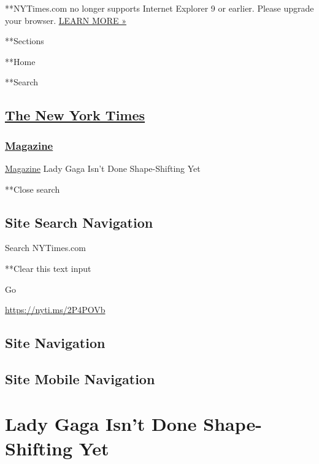  **NYTimes.com no longer supports Internet Explorer 9 or earlier. Please
upgrade your browser.
\href{http://www.nytimes3xbfgragh.onion/content/help/site/ie9-support.html}{LEARN
MORE »}

**Sections

**Home

**Search

\hypertarget{the-new-york-times}{%
\subsection{\texorpdfstring{\href{http://www.nytimes3xbfgragh.onion/}{The
New York Times}}{The New York Times}}\label{the-new-york-times}}

\hypertarget{-magazine-}{%
\subsubsection{\texorpdfstring{
\href{https://www.nytimes3xbfgragh.onion/section/magazine}{Magazine}
}{ Magazine }}\label{-magazine-}}

 \href{https://www.nytimes3xbfgragh.onion/section/magazine}{Magazine}
\textbar{}Lady Gaga Isn't Done Shape-Shifting Yet

**Close search

\hypertarget{site-search-navigation}{%
\subsection{Site Search Navigation}\label{site-search-navigation}}

Search NYTimes.com

**Clear this text input

Go

\url{https://nyti.ms/2P4POVb}

\hypertarget{site-navigation}{%
\subsection{Site Navigation}\label{site-navigation}}

\hypertarget{site-mobile-navigation}{%
\subsection{Site Mobile Navigation}\label{site-mobile-navigation}}

\hypertarget{lady-gaga-isnt-done-shape-shifting-yet}{%
\section{Lady Gaga Isn't Done Shape-Shifting
Yet}\label{lady-gaga-isnt-done-shape-shifting-yet}}

